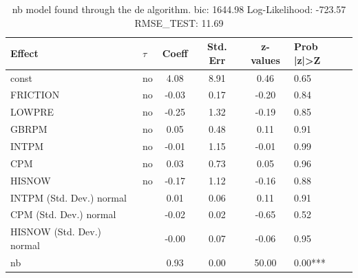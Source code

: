 \begin{table}
	\caption{nb model found through the de algorithm. bic: 1644.98 Log-Likelihood: -723.57 RMSE_TEST: 11.69}
	\begin{center}
		\begin{tabular}{|l|l|c|c|c|l|}
			\hline
			Effect & $\tau$ & Coeff & Std. Err & z-values & Prob |z|>Z \\
			\hline
			const & no & 4.08 & 8.91 & 0.46 & 0.65 \\
			\hline
			FRICTION & no & -0.03 & 0.17 & -0.20 & 0.84 \\
			\hline
			LOWPRE & no & -0.25 & 1.32 & -0.19 & 0.85 \\
			\hline
			GBRPM & no & 0.05 & 0.48 & 0.11 & 0.91 \\
			\hline
			INTPM & no & -0.01 & 1.15 & -0.01 & 0.99 \\
			\hline
			CPM & no & 0.03 & 0.73 & 0.05 & 0.96 \\
			\hline
			HISNOW & no & -0.17 & 1.12 & -0.16 & 0.88 \\
			\hline
			INTPM (Std. Dev.) normal &  & 0.01 & 0.06 & 0.11 & 0.91 \\
			\hline
			CPM (Std. Dev.) normal &  & -0.02 & 0.02 & -0.65 & 0.52 \\
			\hline
			HISNOW (Std. Dev.) normal &  & -0.00 & 0.07 & -0.06 & 0.95 \\
			\hline
			nb &  & 0.93 & 0.00 & 50.00 & 0.00*** \\
			\hline
		\end{tabular}
	\end{center}
\end{table}